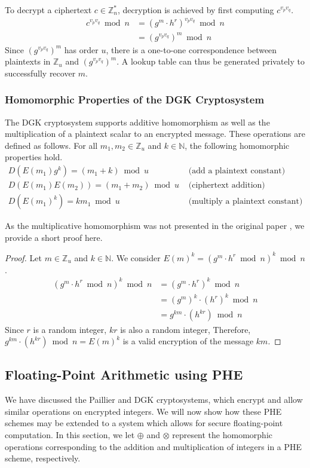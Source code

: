 To decrypt a ciphertext $c \in \mathbb{Z}_n^\ast$, decryption is achieved by first computing $c^{v_pv_q}$.
\begin{align*}
	c^{v_pv_q} \bmod n
	&= (g^m \cdot h^r)^{v_pv_q} \bmod n\\
	&= (g^{v_pv_q})^m \bmod n
\end{align*}
Since $(g^{v_pv_q})^m$ has order $u$, there is a one-to-one correspondence between plaintexts in $\mathbb{Z}_u$ and  $(g^{v_pv_q})^m$. A lookup table can thus be generated privately to successfully recover $m$.

\subsubsection{Homomorphic Properties of the DGK Cryptosystem}
The DGK cryptosystem supports additive homomorphism as well as the multiplication of a plaintext scalar to an encrypted message. These operations are defined as follows.
For all $m_1,m_2 \in \mathbb{Z}_u$ and $k\in \mathbb{N}$, the following homomorphic properties hold.
\begin{align*}
    D(E(m_1)g^k)=(m_1+k)\bmod u & \text{ (add a plaintext constant)}\\
    D(E(m_1)E(m_2))=(m_1+m_2)\bmod u & \text{ (ciphertext addition)}\\
    D(E(m_1)^k)= km_1\bmod u & \text{ (multiply a plaintext constant)}
\end{align*}

As the multiplicative homomorphism was not presented in the original paper \cite{pieprzyk_efficient_2007, cryptoeprint:2008:321}, we provide a short proof here.
\begin{proof}
  Let $m \in \mathbb{Z}_u$ and $k\in \mathbb{N}$.
  We consider $E(m)^k = (g^m \cdot h^r \bmod{n})^k\bmod n$.
  \begin{align*}
    (g^m \cdot h^r \bmod{n})^k \bmod n
    &= (g^m \cdot h^r)^k \bmod{n}\\
    &= (g^m)^k \cdot (h^r)^k \bmod{n}\\
    &= g^{km} \cdot (h^{kr}) \bmod{n}
  \end{align*}
  Since $r$ is a random integer, $kr$ is also a random integer, Therefore, $g^{km} \cdot (h^{kr}) \bmod{n} = E(m)^k$ is a valid encryption of the message $km$.
\end{proof}

\subsection{Floating-Point Arithmetic using PHE}
\label{sec:fp_arithmetic}
We have discussed the Paillier and DGK cryptosystems, which encrypt and allow similar operations on encrypted integers. We will now show how these PHE schemes may be extended to a system which allows for secure floating-point computation. In this section, we let $\oplus$ and $\otimes$ represent the homomorphic operations corresponding to the addition and multiplication of integers in a PHE scheme, respectively. 

